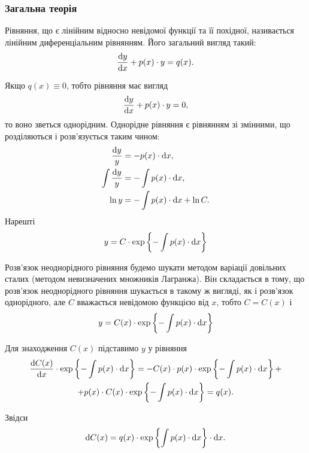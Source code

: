\subsubsection{Загальна теорія}

Рівняння, що є лінійним відносно невідомої функції та її похідної, називається лінійним диференціальним рівнянням. Його загальний вигляд такий:
\begin{equation*}
	\frac{\mathop{}\!\mathrm{d} y}{\mathop{}\!\mathrm{d} x} + p(x) \cdot y = q(x).
\end{equation*}

Якщо $q(x) \equiv 0$, тобто рівняння має вигляд
\begin{equation*}
	\frac{\mathop{}\!\mathrm{d} y}{\mathop{}\!\mathrm{d} x} + p(x) \cdot y = 0,
\end{equation*}
то воно зветься однорідним. Однорідне рівняння є рівнянням зі змінними, що розділяються і розв’язується таким чином:
\begin{align}
	\frac{\mathop{}\!\mathrm{d} y}{y} &= -p(x) \cdot \mathop{}\!\mathrm{d} x, \\
	\int \frac{\mathop{}\!\mathrm{d} y}{y} &= - \int p(x) \cdot \mathop{}\!\mathrm{d} x, \\
	\ln y &= - \int p(x) \cdot \mathop{}\!\mathrm{d} x + \ln C.
\end{align}
Нарешті 
\begin{equation*}
	y = C \cdot \exp \left\{ - \int p(x) \cdot \mathop{}\!\mathrm{d} x \right\}
\end{equation*}

Розв’язок неоднорідного рівняння будемо шукати методом варіації довільних сталих (методом невизначених множників Лагранжа). Він складається в тому, що розв’язок неоднорідного рівняння шукається в такому ж вигляді, як і розв’язок однорідного, але $C$ вважається невідомою функцією від $x$, тобто $C = C(x)$ і 
\begin{equation*}
	y = C(x) \cdot \exp \left\{ - \int p(x) \cdot \mathop{}\!\mathrm{d} x \right\}	
\end{equation*}

Для знаходження $C(x)$ підставимо $y$ у рівняння
\begin{multline} 
	\frac{\mathop{}\!\mathrm{d} C(x)}{\mathop{}\!\mathrm{d} x} \cdot \exp \left\{ - \int p(x) \cdot \mathop{}\!\mathrm{d} x \right\} = - C(x) \cdot p(x) \cdot \exp \left\{ - \int p(x) \cdot \mathop{}\!\mathrm{d} x \right\} + \\
	+ p(x) \cdot C(x) \cdot \exp \left\{ - \int p(x) \cdot \mathop{}\!\mathrm{d} x \right\} = q(x).
\end{multline}

Звідси
\begin{equation*} 
	\mathop{}\!\mathrm{d} C(x) = q(x) \cdot \exp \left\{\int p(x) \cdot \mathop{}\!\mathrm{d} x \right\} \cdot \mathop{}\!\mathrm{d} x.
\end{equation*}

